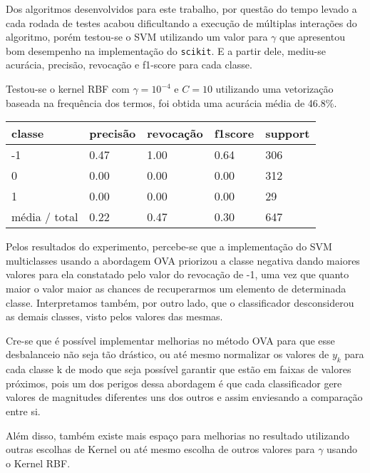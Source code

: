 Dos algoritmos desenvolvidos para este trabalho, por questão do tempo levado a cada rodada de testes
acabou dificultando a execução de múltiplas interações do algoritmo, porém testou-se o SVM 
utilizando um valor para $\gamma$ que apresentou bom desempenho na implementação do \texttt{scikit}.
E a partir dele, mediu-se acurácia, precisão, revocação e f1-score para cada classe.

Testou-se o kernel RBF com $\gamma = 10^{-4}$ e $C = 10$ utilizando
uma vetorização baseada na frequência dos termos, foi obtida uma acurácia média de 46.8\%.

\begin{table}[H]
	\centering
	\begin{tabular}{l | l | l | l | l}
		\hline
		classe  	&	precisão  &  revocação &  f1\-score &  support \\
		\hline
         -1   &    0.47  &    1.00   &   0.64   &    306 \\
         \hline
          0   &    0.00   &   0.00   &   0.00    &   312 \\
          \hline
          1   &    0.00   &   0.00   &   0.00    &    29 \\
		\hline
		média / total   &    0.22   &   0.47   &   0.30   &    647 \\
		\hline
	\end{tabular}
\end{table}

Pelos resultados do experimento, percebe-se que a implementação do SVM multiclasses usando a
abordagem OVA priorizou a classe negativa dando maiores valores para ela constatado pelo valor do 
revocação de -1, uma vez que quanto maior o valor maior as chances de recuperarmos um elemento
de determinada classe. Interpretamos também, por outro lado, que o classificador desconsiderou as 
demais classes, visto pelos valores das mesmas.

Cre-se que é possível implementar melhorias no método OVA para que esse desbalanceio não seja tão
drástico, ou até mesmo normalizar os valores de $y_k$ para cada classe k de modo que seja possível
garantir que estão em faixas de valores próximos, pois um dos perigos dessa abordagem é que cada
classificador gere valores de magnitudes diferentes uns dos outros e assim enviesando a comparação
entre si.

Além disso, também existe mais espaço para melhorias no resultado utilizando outras escolhas de Kernel
ou até mesmo escolha de outros valores para $\gamma$ usando o Kernel RBF.

